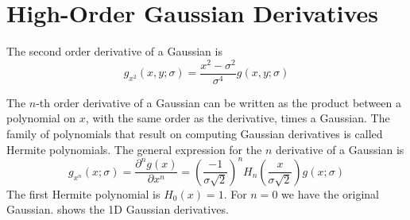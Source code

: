 \section{High-Order Gaussian Derivatives}


The second order derivative of a Gaussian is
\begin{equation}
g_{x^2}(x,y; \sigma) = \frac{x^2-\sigma^2}{\sigma^4} g(x,y; \sigma)
\label{eq:derivate2gauss2dcont}
\end{equation}


The $n$-th order derivative of a Gaussian can be written as the product between a polynomial on $x$, with the same order as the derivative, times a Gaussian. The family of polynomials that result on computing Gaussian derivatives is called Hermite polynomials. The general expression for the $n$ derivative of a Gaussian is
\begin{equation}
g_{x^n}(x; \sigma) =  
\frac{\partial^{n} g(x)}{\partial x^n}
=
\left( \frac{-1}{\sigma \sqrt{2}} \right)^n
H_n\left( \frac{x}{\sigma \sqrt {2}} \right)
g(x; \sigma)
\label{eq:derivate2gauss1dhermite}
\end{equation}
The first Hermite polynomial is $H_0(x)=1$. 
For $n=0$ we have the original Gaussian. \Fig{\ref{fig:gaussian_gaussiander}} shows the 1D Gaussian derivatives.

